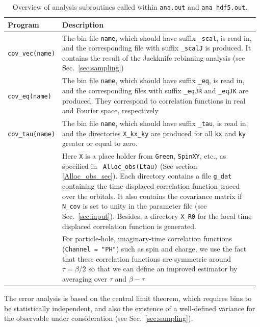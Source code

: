 \begin{table}[h]
	\begin{center}
	\begin{tabular}{@{} p{0.18\linewidth} @{$\;$} p{0.8\linewidth} @{}}\toprule
		Program & Description \\\midrule
		\texttt{cov\_vec(name)}  &  
		  The bin file \texttt{name}, which should have suffix \texttt{\_scal}, is read in, and  the corresponding file with suffix \texttt{\_scalJ} is produced. It contains the result of the Jackknife rebinning analysis (see Sec.~\ref{sec:sampling}) \\
		\texttt{cov\_eq(name)}    &  
		  The bin file \texttt{name}, which should have suffix \texttt{\_eq}, is read in, and the corresponding files with suffix \texttt{\_eqJR} and \texttt{\_eqJK} are produced. They  correspond to correlation functions in real and Fourier space, respectively \\
		\texttt{cov\_tau(name)}   &  
		  The bin file \texttt{name}, which should have suffix \texttt{\_tau}, is read in, and the directories \texttt{X\_kx\_ky} are produced for all \texttt{kx} and \texttt{ky} greater or equal to zero. \\
		& Here \texttt{X}  is a place holder from \texttt{Green}, \texttt{SpinXY}, etc., as specified in \texttt{ Alloc\_obs(Ltau)} (See section \ref{Alloc_obs_sec}). Each directory contains  a  file    \texttt{g\_dat}  containing the  time-displaced correlation function traced over the  orbitals.  It also contains the covariance matrix if \texttt{N\_cov} is set to unity in the parameter file (see Sec.~\ref{sec:input}). Besides, a directory \texttt{X\_R0} for the local time displaced correlation function is generated. \\
		& For particle-hole, imaginary-time correlation functions (\texttt{Channel = "PH"}) such as spin and charge, we use the fact that these correlation functions  are symmetric around $\tau = \beta/2$ so that we can define an improved estimator by averaging over $\tau$ and $\beta - \tau$
		\\\bottomrule
	\end{tabular}
	\caption{Overview of analysis subroutines called within \texttt{ana.out} and \texttt{ana\_hdf5.out}. \label{table:analysis_programs}}
\end{center}
\end{table}
%
The error analysis is based on the central limit theorem, which requires bins to be statistically independent, and also the existence of a well-defined variance for the observable under consideration (see Sec.~\ref{sec:sampling}).
